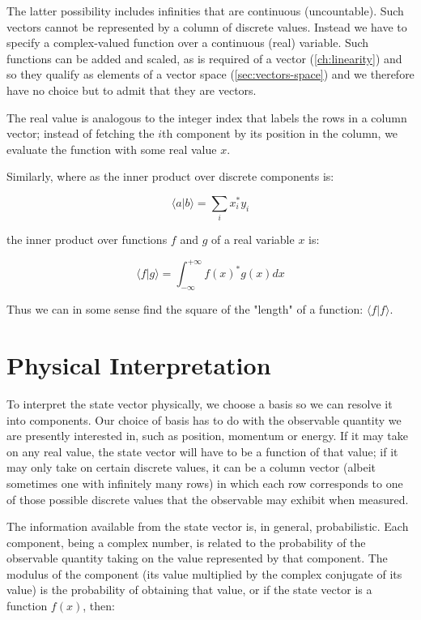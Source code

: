 The latter possibility includes infinities that are continuous (uncountable). Such vectors cannot be represented by a column of discrete values. Instead we have to specify a complex-valued function over a continuous (real) variable. Such functions can be added and scaled, as is required of a vector (\ref{ch:linearity}) and so they qualify as elements of a vector space (\ref{sec:vectors-space}) and we therefore have no choice but to admit that they are vectors.

The real value is analogous to the integer index that labels the rows in a column vector; instead of fetching the $i$th component by its position in the column, we evaluate the function with some real value $x$.

Similarly, where as the inner product over discrete components is:

$$
\langle a | b \rangle
=
\sum_i
x_i^* y_i
$$

the inner product over functions $f$ and $g$ of a real variable $x$ is:

$$
\langle f | g \rangle
=
\int_{-\infty}^{+\infty}
f(x)^* g(x)
dx
$$

Thus we can in some sense find the square of the "length" of a function: $\langle f | f \rangle$.

\section{Physical Interpretation}

To interpret the state vector physically, we choose a basis so we can resolve it into components. Our choice of basis has to do with the observable quantity we are presently interested in, such as position, momentum or energy. If it may take on any real value, the state vector will have to be a function of that value; if it may only take on certain discrete values, it can be a column vector (albeit sometimes one with infinitely many rows) in which each row corresponds to one of those possible discrete values that the observable may exhibit when measured.

The information available from the state vector is, in general, probabilistic. Each component, being a complex number, is related to the probability of the observable quantity taking on the value represented by that component. The modulus of the component (its value multiplied by the complex conjugate of its value) is the probability of obtaining that value, or if the state vector is a function $f(x)$, then:

